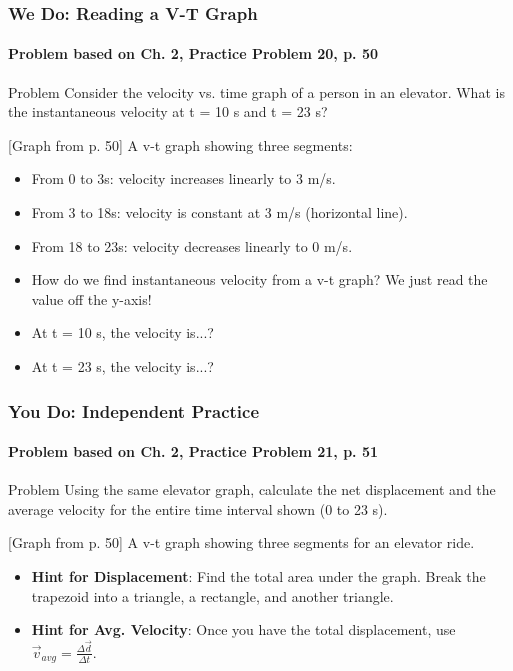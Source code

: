 \documentclass{beamer}
\begin{document}
\begin{frame}
\frametitle{We Do: Reading a V-T Graph}
\framesubtitle{Problem based on Ch. 2, Practice Problem 20, p. 50}
\begin{block}{Problem}
Consider the velocity vs. time graph of a person in an elevator. What is the instantaneous velocity at t = 10 s and t = 23 s?
\end{block}
\begin{alertblock}{[Graph from p. 50]}
A v-t graph showing three segments:
\begin{itemize}
    \item From 0 to 3s: velocity increases linearly to 3 m/s.
    \item From 3 to 18s: velocity is constant at 3 m/s (horizontal line).
    \item From 18 to 23s: velocity decreases linearly to 0 m/s.
\end{itemize}
\end{alertblock}
\pause
\begin{itemize}
    \item How do we find instantaneous velocity from a v-t graph? \alert{We just read the value off the y-axis!}
    \item At t = 10 s, the velocity is...?
    \item At t = 23 s, the velocity is...?
\end{itemize}
\end{frame}

\begin{frame}
\frametitle{You Do: Independent Practice}
\framesubtitle{Problem based on Ch. 2, Practice Problem 21, p. 51}
\begin{block}{Problem}
Using the same elevator graph, calculate the net displacement and the average velocity for the entire time interval shown (0 to 23 s).
\end{block}
\begin{alertblock}{[Graph from p. 50]}
A v-t graph showing three segments for an elevator ride.
\end{alertblock}
\begin{itemize}
    \item \textbf{Hint for Displacement}: Find the total area under the graph. Break the trapezoid into a triangle, a rectangle, and another triangle.
    \item \textbf{Hint for Avg. Velocity}: Once you have the total displacement, use $\vec{v}_{avg} = \frac{\Delta \vec{d}}{\Delta t}$.
\end{itemize}
\end{frame}
\end{document}
